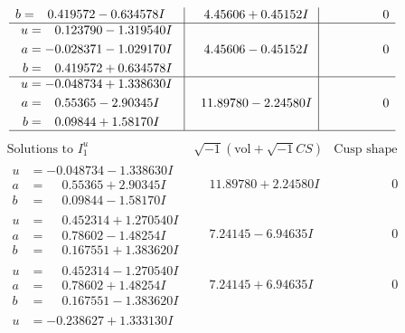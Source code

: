 \documentclass[1p]{elsarticle_modified}
\theoremstyle{definition}
\newcommand{\I}{\sqrt{-1}}
\begin{document}
$$\begin{array}{c|c|c}
\begin{aligned}
b &= \phantom{-}0.419572 - 0.634578 I\end{aligned}
 & \phantom{-}4.45606 + 0.45152 I & \phantom{-0.000000 } 0 \\ \hline\begin{aligned}
u &= \phantom{-}0.123790 - 1.319540 I \\
a &= -0.028371 - 1.029170 I \\
b &= \phantom{-}0.419572 + 0.634578 I\end{aligned}
 & \phantom{-}4.45606 - 0.45152 I & \phantom{-0.000000 } 0 \\ \hline\begin{aligned}
u &= -0.048734 + 1.338630 I \\
a &= \phantom{-}0.55365 - 2.90345 I \\
b &= \phantom{-}0.09844 + 1.58170 I\end{aligned}
 & \phantom{-}11.89780 - 2.24580 I & \phantom{-0.000000 } 0\\
 \hline 
 \end{array}$$\newpage$$\begin{array}{c|c|c}  
\text{Solutions to }I^u_{1}& \I (\text{vol} + \sqrt{-1}CS) & \text{Cusp shape}\\
 \hline 
\begin{aligned}
u &= -0.048734 - 1.338630 I \\
a &= \phantom{-}0.55365 + 2.90345 I \\
b &= \phantom{-}0.09844 - 1.58170 I\end{aligned}
 & \phantom{-}11.89780 + 2.24580 I & \phantom{-0.000000 } 0 \\ \hline\begin{aligned}
u &= \phantom{-}0.452314 + 1.270540 I \\
a &= \phantom{-}0.78602 - 1.48254 I \\
b &= \phantom{-}0.167551 + 1.383620 I\end{aligned}
 & \phantom{-}7.24145 - 6.94635 I & \phantom{-0.000000 } 0 \\ \hline\begin{aligned}
u &= \phantom{-}0.452314 - 1.270540 I \\
a &= \phantom{-}0.78602 + 1.48254 I \\
b &= \phantom{-}0.167551 - 1.383620 I\end{aligned}
 & \phantom{-}7.24145 + 6.94635 I & \phantom{-0.000000 } 0 \\ \hline\begin{aligned}
u &= -0.238627 + 1.333130 I \\

\end{aligned}
\end{array}$$
\end{document}
